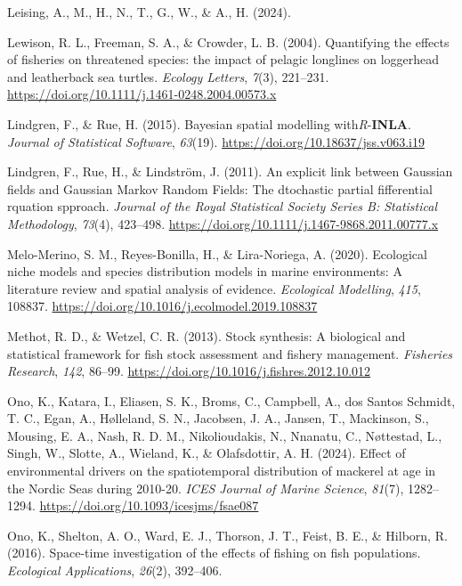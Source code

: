 \documentclass[
]{article}
\newlength{\cslhangindent}
\newenvironment{CSLReferences}[2] %
 {\begin{list}{}{%
  \setlength{\itemindent}{0pt}
  \setlength{\leftmargin}{0pt}
  \setlength{\parsep}{0pt}
  \ifodd #1
   \setlength{\leftmargin}{\cslhangindent}
   \setlength{\itemindent}{-1\cslhangindent}
  \fi
  \setlength{\itemsep}{#2\baselineskip}}}
 {\end{list}}
\begin{document}
\begin{CSLReferences}{1}{0}
Leising, A., M., H., N., T., G., W., \& A., H. (2024).

Lewison, R. L., Freeman, S. A., \& Crowder, L. B. (2004). {Quantifying
the effects of fisheries on threatened species: the impact of pelagic
longlines on loggerhead and leatherback sea turtles}. \emph{Ecology
Letters}, \emph{7}(3), 221--231.
\url{https://doi.org/10.1111/j.1461-0248.2004.00573.x}

Lindgren, F., \& Rue, H. (2015). {Bayesian spatial modelling
with{\emph{R}}-{\textbf{INLA}}}. \emph{Journal of Statistical Software},
\emph{63}(19). \url{https://doi.org/10.18637/jss.v063.i19}

Lindgren, F., Rue, H., \& Lindström, J. (2011). {An explicit link
between Gaussian fields and Gaussian Markov Random Fields: The
dtochastic partial fifferential rquation spproach}. \emph{Journal of the
Royal Statistical Society Series B: Statistical Methodology},
\emph{73}(4), 423--498.
\url{https://doi.org/10.1111/j.1467-9868.2011.00777.x}

Melo-Merino, S. M., Reyes-Bonilla, H., \& Lira-Noriega, A. (2020).
{Ecological niche models and species distribution models in marine
environments: A literature review and spatial analysis of evidence}.
\emph{Ecological Modelling}, \emph{415}, 108837.
\url{https://doi.org/10.1016/j.ecolmodel.2019.108837}

Methot, R. D., \& Wetzel, C. R. (2013). {Stock synthesis: A biological
and statistical framework for fish stock assessment and fishery
management}. \emph{Fisheries Research}, \emph{142}, 86--99.
\url{https://doi.org/10.1016/j.fishres.2012.10.012}

Ono, K., Katara, I., Eliasen, S. K., Broms, C., Campbell, A., dos Santos
Schmidt, T. C., Egan, A., Hølleland, S. N., Jacobsen, J. A., Jansen, T.,
Mackinson, S., Mousing, E. A., Nash, R. D. M., Nikolioudakis, N.,
Nnanatu, C., Nøttestad, L., Singh, W., Slotte, A., Wieland, K., \&
Olafsdottir, A. H. (2024). {Effect of environmental drivers on the
spatiotemporal distribution of mackerel at age in the Nordic Seas during
2010{-}20}. \emph{ICES Journal of Marine Science}, \emph{81}(7),
1282--1294. \url{https://doi.org/10.1093/icesjms/fsae087}

Ono, K., Shelton, A. O., Ward, E. J., Thorson, J. T., Feist, B. E., \&
Hilborn, R. (2016). {Space-time investigation of the effects of fishing
on fish populations}. \emph{Ecological Applications}, \emph{26}(2),
392--406.


\end{CSLReferences}
\end{document}
